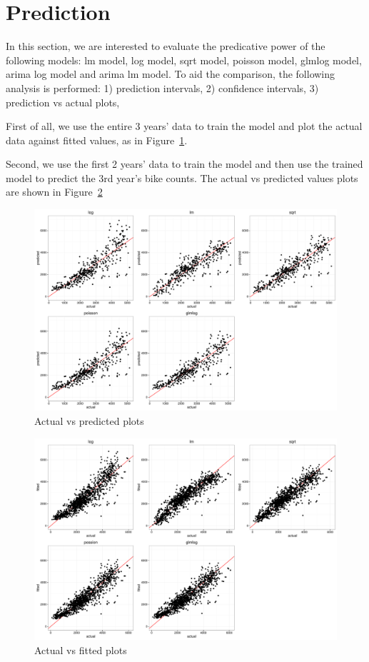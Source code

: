 \documentclass [11pt, proquest] {uwthesis}[2015/03/03]
\begin{document}
\section{Prediction}

In this section, we are interested to evaluate the predicative power of the following models: lm model, log model, sqrt model, poisson model, glmlog model, arima log model and arima lm model. To aid the comparison, the following analysis is performed: 1) prediction intervals, 2) confidence intervals, 3) prediction vs actual plots,

First of all, we use the entire 3 years' data to train the model and plot the actual data against fitted values, as in Figure~\ref{fig:avp_fitted}.

Second, we use the first 2 years' data to train the model and then use the trained model to predict the 3rd year's bike counts. The actual vs predicted values plots are shown in Figure~\ref{fig:avp_crossvalidate}

\begin{figure}
\includegraphics[width=1\textwidth]{figures/actualvspred.pdf}
\caption{Actual vs predicted plots}
\label{fig:avp_fitted}
\end{figure}

\begin{figure}
\includegraphics[width=1\textwidth]{figures/actualvsfited.pdf}
\caption{Actual vs fitted plots}
\label{fig:avp_crossvalidate}
\end{figure}
\end{document}
